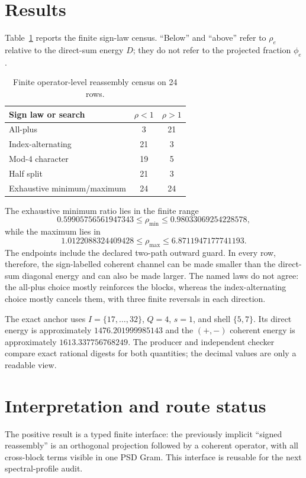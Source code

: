\documentclass[10pt]{article}
\begin{document}
\section{Results}

Table~\ref{tab:atlas} reports the finite sign-law census.  ``Below'' and
``above'' refer to $\rho_e$ relative to the direct-sum energy $D$; they do
not refer to the projected fraction $\phi_e$.

\begin{table}[t]
\centering
\small
\caption{Finite operator-level reassembly census on 24 rows.}
\label{tab:atlas}
\begin{tabular}{lcc}
\toprule
Sign law or search & $\rho<1$ & $\rho>1$\\
\midrule
All-plus & 3 & 21\\
Index-alternating & 21 & 3\\
Mod-4 character & 19 & 5\\
Half split & 21 & 3\\
Exhaustive minimum/maximum & 24 & 24\\
\bottomrule
\end{tabular}
\end{table}

The exhaustive minimum ratio lies in the finite range
\[
 0.59905756561947343\leq\rho_{\min}\leq0.98033069254228578,
\]
while the maximum lies in
\[
 1.0122088324409428\leq\rho_{\max}\leq6.8711947177741193.
\]
The endpoints include the declared two-path outward guard.  In every row,
therefore, the sign-labelled coherent channel can be made smaller than the
direct-sum diagonal energy and can also be made larger.  The named laws do
not agree: the all-plus choice mostly reinforces the blocks, whereas the
index-alternating choice mostly cancels them, with three finite reversals in
each direction.

The exact anchor uses $I=\{17,\ldots,32\}$, $Q=4$, $s=1$, and shell
$\{5,7\}$.  Its direct energy is approximately $1476.201999985143$ and the
$(+,-)$ coherent energy is approximately $1613.337756768249$.  The producer
and independent checker compare exact rational digests for both quantities;
the decimal values are only a readable view.

\section{Interpretation and route status}

The positive result is a typed finite interface: the previously implicit
``signed reassembly'' is an orthogonal projection followed by a coherent
operator, with all cross-block terms visible in one PSD Gram.  This interface
is reusable for the next spectral-profile audit.
\end{document}
